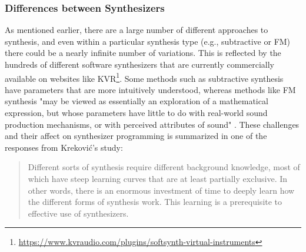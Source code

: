 \subsubsection{Differences between Synthesizers}
As mentioned earlier, there are a large number of different approaches to synthesis, and even within a particular synthesis type (e.g., subtractive or FM) there could be a nearly infinite number of variations. This is reflected by the hundreds of different software synthesizers that are currently commercially available on websites like KVR\footnote{\url{https://www.kvraudio.com/plugins/softsynth-virtual-instruments}}. Some methods such as subtractive synthesis have parameters that are more intuitively understood, whereas methods like FM synthesis "may be viewed as essentially an exploration of a mathematical expression, but whose parameters have little to do with real-world sound production mechanisms, or with perceived attributes of sound" \cite{seago2013new}. These challenges and their affect on synthesizer programming is summarized in one of the responses from Krekovi\'{c}'s study:

\begin{quote}
    Different sorts of synthesis require different background knowledge, most of which have steep learning curves that are at least partially exclusive. In other words, there is an enormous investment of time to deeply learn how the different forms of synthesis work. This learning is a prerequisite to effective use of synthesizers.
\end{quote}





